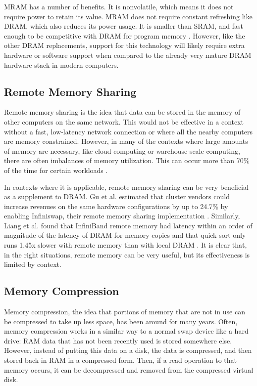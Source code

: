 \documentclass[doublespace,nopageskip]{VTthesis}
\begin{document}
MRAM has a number of benefits. It is nonvolatile, which means it does not require power to retain its value. MRAM does not require constant refreshing like DRAM, which also reduces its power usage. It is smaller than SRAM, and fast enough to be competitive with DRAM for program memory \cite{mram99, mramprospects}. However, like the other DRAM replacements, support for this technology will likely require extra hardware or software support when compared to the already very mature DRAM hardware stack in modern computers.

\subsection{Remote Memory Sharing}\label{ss:remote_memory_sharing}
Remote memory sharing is the idea that data can be stored in the memory of other computers on the same network. This would not be effective in a context without a fast, low-latency network connection or where all the nearby computers are memory constrained. However, in many of the contexts where large amounts of memory are necessary, like cloud computing or warehouse-scale computing, there are often imbalances of memory utilization. This can occur more than 70\% of the time for certain workloads \cite{infiniswap}.

In contexts where it is applicable, remote memory sharing can be very beneficial as a supplement to DRAM. Gu et al. estimated that cluster vendors could increase revenues on the same hardware configurations by up to 24.7\% by enabling Infiniswap, their remote memory sharing implementation \cite{infiniswap}. Similarly, Liang et al. found that InfiniBand remote memory had latency within an order of magnitude of the latency of DRAM for memory copies and that quick sort only runs 1.45x slower with remote memory than with local DRAM \cite{swapinfiniband}. It is clear that, in the right situations, remote memory can be very useful, but its effectiveness is limited by context.

\subsection{Memory Compression}\label{ss:memory_compression}
Memory compression, the idea that portions of memory that are not in use can be compressed to take up less space, has been around for many years. Often, memory compression works in a similar way to a normal swap device like a hard drive: RAM data that has not been recently used is stored somewhere else. However, instead of putting this data on a disk, the data is compressed, and then stored back in RAM in a compressed form. Then, if a read operation to that memory occurs, it can be decompressed and removed from the compressed virtual disk.
\end{document}
